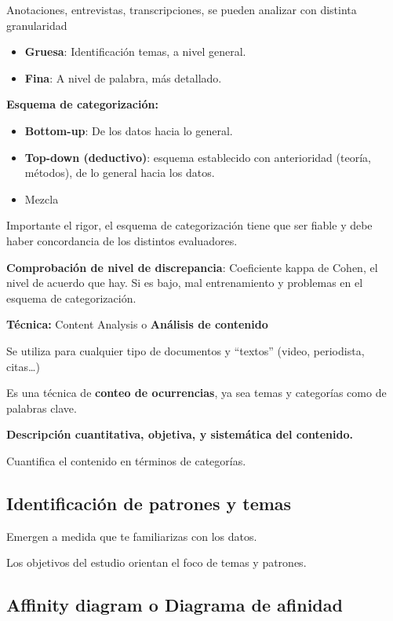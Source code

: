 \documentclass[12pt]{report} %
\begin{document}
Anotaciones, entrevistas, transcripciones, se pueden analizar con
distinta granularidad

\begin{itemize}

\item
  \textbf{Gruesa}: Identificación temas, a nivel general.
\item
  \textbf{Fina}: A nivel de palabra, más detallado.
\end{itemize}

\textbf{Esquema de categorización:}

\begin{itemize}

\item
  \textbf{Bottom-up}: De los datos hacia lo general.
\item
  \textbf{Top-down (deductivo)}: esquema establecido con anterioridad
  (teoría, métodos), de lo general hacia los datos.
\item
  Mezcla
\end{itemize}

Importante el rigor, el esquema de categorización tiene que ser fiable y
debe haber concordancia de los distintos evaluadores.

\textbf{Comprobación de nivel de discrepancia}: Coeficiente kappa de Cohen, el
nivel de acuerdo que hay. Si es bajo, mal entrenamiento y problemas en
el esquema de categorización.

\textbf{Técnica:} Content Analysis o \textbf{Análisis de contenido}

Se utiliza para cualquier tipo de documentos y ``textos'' (video,
periodista, citas\ldots)

Es una técnica de \textbf{conteo de ocurrencias}, ya sea temas y
categorías como de palabras clave.

\textbf{Descripción cuantitativa, objetiva, y sistemática del
contenido.}

Cuantifica el contenido en términos de categorías.

\subsection{Identificación de patrones y
temas}

Emergen a medida que te familiarizas con los datos.

Los objetivos del estudio orientan el foco de temas y patrones.

\subsection{Affinity diagram o Diagrama de
afinidad}
\end{document}
